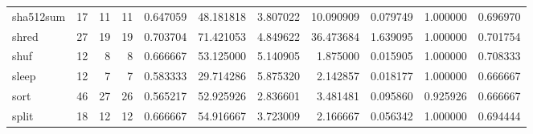 \begin{longtable}{lrrrrrrrrrr}
sha512sum &                                      17 &                 11 &                                11 &                                   0.647059 &                              48.181818 &                                     3.807022 &                         10.090909 &                                0.079749 &                           1.000000 &                                           0.696970 \\
shred     &                                      27 &                 19 &                                19 &                                   0.703704 &                              71.421053 &                                     4.849622 &                         36.473684 &                                1.639095 &                           1.000000 &                                           0.701754 \\
shuf      &                                      12 &                  8 &                                 8 &                                   0.666667 &                              53.125000 &                                     5.140905 &                          1.875000 &                                0.015905 &                           1.000000 &                                           0.708333 \\
sleep     &                                      12 &                  7 &                                 7 &                                   0.583333 &                              29.714286 &                                     5.875320 &                          2.142857 &                                0.018177 &                           1.000000 &                                           0.666667 \\
sort      &                                      46 &                 27 &                                26 &                                   0.565217 &                              52.925926 &                                     2.836601 &                          3.481481 &                                0.095860 &                           0.925926 &                                           0.666667 \\
split     &                                      18 &                 12 &                                12 &                                   0.666667 &                              54.916667 &                                     3.723009 &                          2.166667 &                                0.056342 &                           1.000000 &                                           0.694444 \\

\end{longtable}
